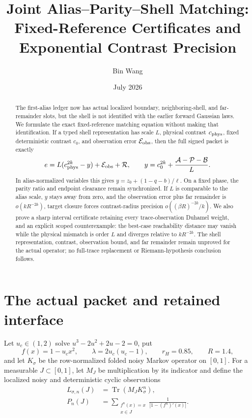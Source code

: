 \documentclass[11pt]{article}
\title{Joint Alias--Parity--Shell Matching:\\
Fixed-Reference Certificates and Exponential Contrast Precision}
\author{Bin Wang}
\date{July 2026}
\theoremstyle{remark}
\newcommand{\Tr}{\operatorname{Tr}}
\newcommand{\cA}{\mathcal A}
\newcommand{\cB}{\mathcal B}
\newcommand{\cE}{\mathcal E}
\newcommand{\cP}{\mathcal P}
\newcommand{\cR}{\mathcal R}
\begin{document}
\maketitle

\begin{abstract}
The first-alias ledger now has actual localized boundary, neighboring-shell,
and far-remainder slots, but the shell is not identified with the earlier
forward Gaussian laws.  We formulate the exact fixed-reference matching
equation without making that identification.  If a typed shell representation
has scale $L$, physical contrast $c_{\rm phys}$, fixed deterministic contrast
$c_0$, and observation error $\cE_{\rm obs}$, then the full signed packet is
exactly
\[
 e=L(c_{\rm phys}^{2k}-y)+\cE_{\rm obs}+\cR,
 \qquad
 y=c_0^{2k}+\frac{\cA-\cP-\cB}{L}.
\]
In alias-normalized variables this gives
$y=z_0+(1-q-b)/\ell$.  On a fixed phase, the parity ratio and endpoint
clearance remain synchronized.  If $L$ is comparable to the alias scale,
$y$ stays away from zero, and the observation error plus far remainder is
$o(kR^{-2k})$, target closure forces contrast-radius precision
$o((\beta R)^{-2k}/k)$.  We also prove a sharp interval certificate retaining
every trace-observation Duhamel weight, and an explicit scoped counterexample:
the best-case reachability distance may vanish while the physical mismatch is
order $L$ and diverges relative to $kR^{-2k}$.  The shell representation,
contrast, observation bound, and far remainder remain unproved for the actual
operator; no full-trace replacement or Riemann-hypothesis conclusion follows.
\end{abstract}

\section{The actual packet and retained interface}

Let $u_c\in(1,2)$ solve
$u^3-2u^2+2u-2=0$, put
\begin{equation}
 f(x)=1-u_cx^2,
 \qquad
 \lambda=2u_c(u_c-1),
 \qquad
 r_H=0.85,
 \qquad
 R=1.4,
 \label{eq:route-constants}
\end{equation}
and let $K_\sigma$ be the row-normalized folded noisy Markov operator on
$[0,1]$.  For a measurable $J\subset[0,1]$, let $M_J$ be multiplication by
its indicator and define the localized noisy and deterministic cyclic
observations
\begin{align}
 L_{\sigma,n}(J)&=\Tr(M_JK_\sigma^n),
 \label{eq:localized-noisy}\\
 P_n(J)&=\sum_{\substack{f^n(x)=x\\x\in J}}
 \frac{1}{|1-(f^n)'(x)|}.
 \label{eq:localized-flat}
\end{align}
\end{document}
